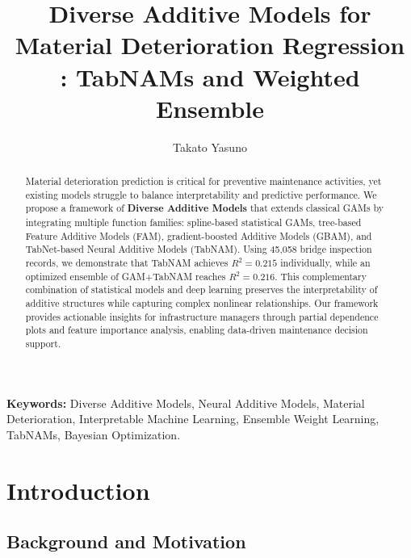 \documentclass[twocolumn]{article}
\title{Diverse Additive Models for Material Deterioration Regression\\
: TabNAMs and Weighted Ensemble}
\author[1]{Takato Yasuno}
\date{}
\begin{document}
\renewcommand{\abstractname}{Abstract}
\renewcommand{\refname}{References}
\renewcommand{\figurename}{Figure}
\renewcommand{\tablename}{Table}

\maketitle

\begin{abstract}

Material deterioration prediction is critical for preventive maintenance activities, yet existing models struggle to balance interpretability and predictive performance. We propose a framework of \textbf{Diverse Additive Models} that extends classical GAMs by integrating multiple function families: spline-based statistical GAMs, tree-based Feature Additive Models (FAM), gradient-boosted Additive Models (GBAM), and TabNet-based Neural Additive Models (TabNAM). Using 45,058 bridge inspection records, we demonstrate that TabNAM achieves $R^2=0.215$ individually, while an optimized ensemble of GAM+TabNAM reaches $R^2=0.216$. This complementary combination of statistical models and deep learning preserves the interpretability of additive structures while capturing complex nonlinear relationships. Our framework provides actionable insights for infrastructure managers through partial dependence plots and feature importance analysis, enabling data-driven maintenance decision support.

\end{abstract}

\noindent
\textbf{Keywords:} Diverse Additive Models, Neural Additive Models, Material Deterioration, Interpretable Machine Learning, Ensemble Weight Learning, TabNAMs, Bayesian Optimization.

\section{Introduction}
\label{sec:intro}

\subsection{Background and Motivation}
\end{document}
